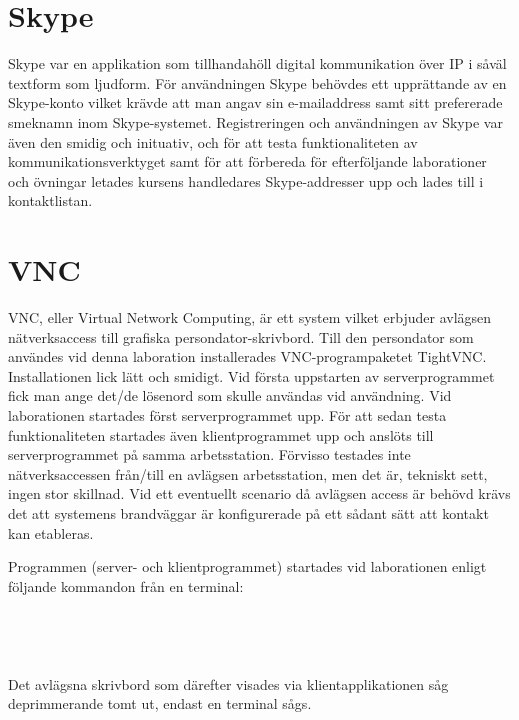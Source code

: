 \documentclass[a4paper,10pt]{article}
\begin{document}
\section{Skype}
Skype var en applikation som tillhandahöll digital kommunikation över IP i såväl textform som ljudform. För användningen Skype behövdes ett upprättande av en Skype-konto vilket krävde att man angav sin e-mailaddress samt sitt prefererade smeknamn inom Skype-systemet. Registreringen och användningen av Skype var även den smidig och inituativ, och för att testa funktionaliteten av kommunikationsverktyget samt för att förbereda för efterföljande laborationer och övningar letades kursens handledares Skype-addresser upp och lades till i kontaktlistan.

\section{VNC}
VNC, eller Virtual Network Computing, är ett system vilket erbjuder avlägsen nätverksaccess till grafiska persondator-skrivbord. Till den persondator som användes vid denna laboration installerades VNC-programpaketet TightVNC. Installationen lick lätt och smidigt. Vid första uppstarten av serverprogrammet fick man ange det/de lösenord som skulle användas vid användning. Vid laborationen startades först serverprogrammet upp. För att sedan testa funktionaliteten startades även klientprogrammet upp och anslöts till serverprogrammet på samma arbetsstation. Förvisso testades inte nätverksaccessen från/till en avlägsen arbetsstation, men det är, tekniskt sett, ingen stor skillnad. Vid ett eventuellt scenario då avlägsen access är behövd krävs det att systemens brandväggar är konfigurerade på ett sådant sätt att kontakt kan etableras.

Programmen (server- och klientprogrammet) startades vid laborationen enligt följande kommandon från en terminal:
\\
\\
\\
\\
\\
Det avlägsna skrivbord som därefter visades via klientapplikationen såg deprimmerande tomt ut, endast en terminal sågs.
\end{document}
